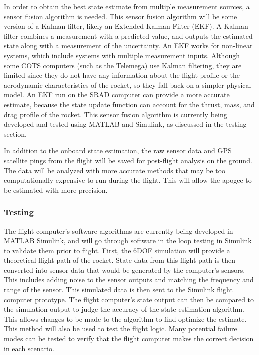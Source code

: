In order to obtain the best state estimate from multiple measurement sources, a sensor fusion algorithm is needed. This sensor fusion algorithm will be some version of a Kalman filter, likely an Extended Kalman Filter (EKF). A Kalman filter combines a measurement with a predicted value, and outputs the estimated state along with a measurement of the uncertainty. An EKF works for non-linear systems, which include systems with multiple measurement inputs.  Although some COTS computers (such as the Telemega) use Kalman filtering, they are limited since they do not have any information about the flight profile or the aerodynamic characteristics of the rocket, so they fall back on a simpler physical model. An EKF run on the SRAD computer can provide a more accurate estimate, because the state update function can account for the thrust, mass, and drag profile of the rocket. This sensor fusion algorithm is currently being developed and tested using MATLAB and Simulink, as discussed in the testing section.

In addition to the onboard state estimation, the raw sensor data and GPS satellite pings from the flight will be saved for post-flight analysis on the ground. The data will be analyzed with more accurate methods that may be too computationally expensive to run during the flight. This will allow the apogee to be estimated with more precision.


\subsubsection{Testing} \label{section:avionics-testing}
The flight computer’s software algorithms are currently being developed in MATLAB Simulink, and will go through software in the loop testing in Simulink to validate them prior to flight. First, the 6DOF simulation will provide a theoretical flight path of the rocket. State data from this flight path is then converted into sensor data that would be generated by the computer’s sensors. This includes adding noise to the sensor outputs and matching the frequency and range of the sensor. This simulated data is then sent to the Simulink flight computer prototype. The flight computer’s state output can then be compared to the simulation output to judge the accuracy of the state estimation algorithm. This allows changes to be made to the algorithm to find optimize the estimate. This method will also be used to test the flight logic. Many potential failure modes can be tested to verify that the flight computer makes the correct decision in each scenario.

